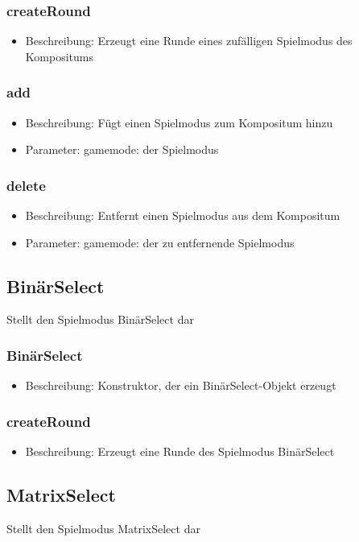 \documentclass[a4paper]{scrreprt}
\begin{document}
	\subsubsection{createRound}
	\begin{itemize}
		\item Beschreibung: Erzeugt eine Runde eines zufälligen Spielmodus des Kompositums
	\end{itemize}
	\subsubsection{add}
	\begin{itemize}
		\item Beschreibung: Fügt einen Spielmodus zum Kompositum hinzu
		\item Parameter: gamemode: der Spielmodus
	\end{itemize}
	\subsubsection{delete}
	\begin{itemize}
		\item Beschreibung: Entfernt einen Spielmodus aus dem Kompositum
		\item Parameter: gamemode: der zu entfernende Spielmodus
	\end{itemize}

	\subsection{BinärSelect}
	Stellt den Spielmodus BinärSelect dar
	\subsubsection{BinärSelect}
		\begin{itemize}
		\item Beschreibung: Konstruktor, der ein BinärSelect-Objekt erzeugt
		\end{itemize}
	\subsubsection{createRound}
	\begin{itemize}
		\item Beschreibung: Erzeugt eine Runde des Spielmodus BinärSelect
	\end{itemize}

	\subsection{MatrixSelect}
	Stellt den Spielmodus MatrixSelect dar
\end{document}
